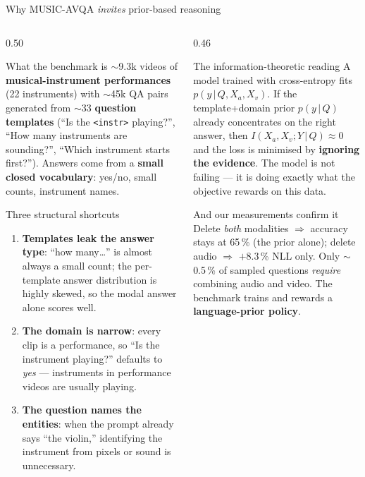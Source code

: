 \documentclass[10pt,aspectratio=169]{beamer}
\begin{document}
\begin{frame}{Why MUSIC-AVQA \emph{invites} prior-based reasoning}

\begin{columns}[T]
\begin{column}{0.50\textwidth}
\begin{block}{What the benchmark is}
{\footnotesize
$\sim$9.3k videos of \textbf{musical-instrument performances} (22 instruments)
with $\sim$45k QA pairs generated from $\sim$33 \textbf{question templates}
(``Is the \texttt{<instr>} playing?'', ``How many instruments are sounding?'',
``Which instrument starts first?''). Answers come from a \textbf{small closed
vocabulary}: yes/no, small counts, instrument names.}
\end{block}

\begin{block}{Three structural shortcuts}
{\footnotesize
\begin{enumerate}\setlength\itemsep{2pt}
  \item \textbf{Templates leak the answer type}: ``how many\ldots'' is almost
        always a small count; the per-template answer distribution is highly
        skewed, so the modal answer alone scores well.
  \item \textbf{The domain is narrow}: every clip is a performance, so
        ``Is the instrument playing?'' defaults to \emph{yes} ---
        instruments in performance videos are usually playing.
  \item \textbf{The question names the entities}: when the prompt already says
        ``the violin,'' identifying the instrument from pixels or sound is
        unnecessary.
\end{enumerate}}
\end{block}
\end{column}

\begin{column}{0.46\textwidth}
\begin{block}{The information-theoretic reading}
{\footnotesize
A model trained with cross-entropy fits $p(y\,|\,Q,X_a,X_v)$. If the
template+domain prior $p(y\,|\,Q)$ already concentrates on the right answer,
then $I(X_a,X_v;Y\,|\,Q)\!\approx\!0$ and the loss is minimised by
\textbf{ignoring the evidence}. The model is not failing --- it is doing
exactly what the objective rewards on this data.}
\end{block}

\begin{block}{And our measurements confirm it}
{\footnotesize
Delete \emph{both} modalities $\Rightarrow$ accuracy stays at 65\,\%
(the prior alone); delete audio $\Rightarrow$ $+8.3$\,\% NLL only.
Only $\sim$0.5\,\% of sampled questions \emph{require} combining audio and
video. The benchmark trains and rewards a \textbf{language-prior policy}.}
\end{block}
\end{column}
\end{columns}

\end{frame}
\end{document}
